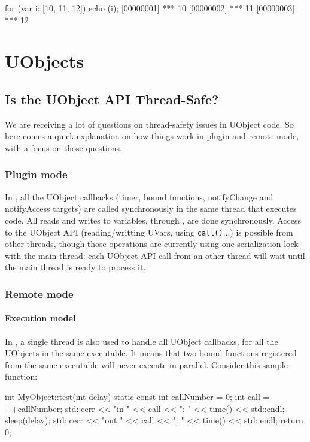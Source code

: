 \begin{urbiscript}
for (var i: [10, 11, 12]) echo (i);
[00000001] *** 10
[00000002] *** 11
[00000003] *** 12
\end{urbiscript}

\section{UObjects}
\subsection{Is the UObject API Thread-Safe?}
We are receiving a lot of questions on thread-safety issues in UObject
code. So here comes a quick explanation on how things work in plugin
and remote mode, with a focus on those questions.

\subsubsection{Plugin mode}

In , all the UObject callbacks (timer, bound
functions, notifyChange and notifyAccess targets) are called
synchronously in the same thread that executes \us code. All reads and
writes to \urbi variables, through , are done
synchronously. Access to the UObject API (reading/writting UVars, using
\lstinline|call()|...) is possible from other threads, though those operations
are currently using one serialization lock with the main thread: each UObject
API call from an other thread will wait until the main thread is ready to
process it.


\subsubsection{Remote mode}

\paragraph{Execution model}

In , a single thread is also used to handle all
UObject callbacks, for all the UObjects in the same executable. It
means that two bound functions registered from the same executable
will never execute in parallel. Consider this sample \Cxx function:

\begin{cxx}
int MyObject::test(int delay)
{
  static const int callNumber = 0;
  int call = ++callNumber;
  std::cerr << "in "  << call << ": " << time() << std::endl;
  sleep(delay);
  std::cerr << "out " << call << ": " << time() << std::endl;
  return 0;
}
\end{cxx}

